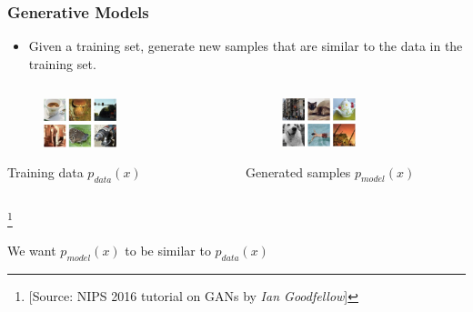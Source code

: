 \documentclass{beamer}
\begin{document}
\begin{frame}
    \frametitle{Generative Models}
    \begin{itemize}
        \item Given a training set, generate new samples that are similar to the 
        data in the training set.
    \end{itemize}
        \begin{columns}
            \begin{center}
                \begin{figure}
                    \includegraphics[width=0.5\textwidth]{images/trainset.png}
                \end{figure}
                {Training data $p _{data} (x)$}
            \end{center}
            
            \begin{center}
                \begin{figure}
                    \includegraphics[width=0.5\textwidth]{images/modeloutput.png}
                \end{figure}
                {Generated samples $p _{model} (x)$} \\
            \end{center}
        \end{columns}
        \footnote{[Source: NIPS 2016 tutorial on GANs by \textit{Ian Goodfellow}]}
        \begin{center}
            \pause\color{blue}\Large{We want  $p _{model} (x)$ to be similar to $p _{data} (x)$}
        \end{center}
\end{frame}
\end{document}
